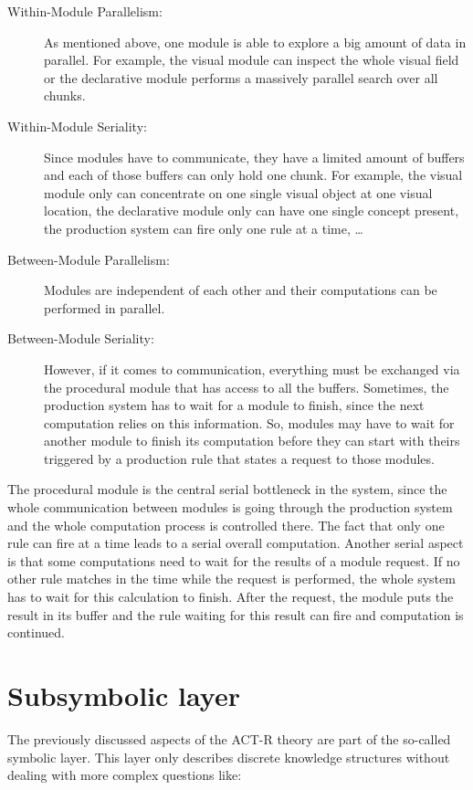 \begin{description}
 \item[Within-Module Parallelism:] As mentioned above, one module is able to explore a big amount of data in parallel. For example, the visual module can inspect the whole visual field or the declarative module performs a massively parallel search over all chunks.
 \item[Within-Module Seriality:] Since modules have to communicate, they have a limited amount of buffers and each of those buffers can only hold one chunk. For example, the visual module only can concentrate on one single visual object at one visual location, the declarative module only can have one single concept present, the production system can fire only one rule at a time, \dots 
 \item[Between-Module Parallelism:] Modules are independent of each other and their computations can be performed in parallel.
 \item[Between-Module Seriality:] However, if it comes to communication, everything must be exchanged via the procedural module that has access to all the buffers. Sometimes, the production system has to wait for a module to finish, since the next computation relies on this information. So, modules may have to wait for another module to finish its computation before they can start with theirs triggered by a production rule that states a request to those modules.
\end{description}

The procedural module is the central serial bottleneck in the system, since the whole communication between modules is going through the production system and the whole computation process is controlled there. The fact that only one rule can fire at a time leads to a serial overall computation. Another serial aspect is that some computations need to wait for the results of a module request. If no other rule matches in the time while the request is performed, the whole system has to wait for this calculation to finish. After the request, the module puts the result in its buffer and the rule waiting for this result can fire and computation is continued.

\section{Subsymbolic layer}
\label{subsymbolic_layer}

The previously discussed aspects of the ACT-R theory are part of the so-called symbolic layer. This layer only describes discrete knowledge structures without dealing with more complex questions like: 

